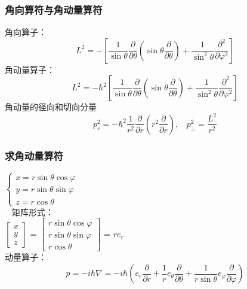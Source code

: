 \begin{frame}
	\frametitle{ 角向算符与角动量算符 }	
	角向算子：
	\begin{equation*}
		L^2 = - \left[ \frac{1}{ \sin \theta  } \frac{\partial }{\partial \theta } (\sin \theta \frac{\partial }{\partial \theta } )
		+\frac{1}{ \sin^2 \theta  } \frac{\partial^2}{\partial\varphi ^2} \right]
	\end{equation*}	
    角动量算子：
		\begin{equation*}
		L^2 = -\hbar ^2 \left[ \frac{1}{ \sin \theta  } \frac{\partial }{\partial \theta } (\sin \theta \frac{\partial }{\partial \theta } )
		+\frac{1}{ \sin^2 \theta  } \frac{\partial^2}{\partial\varphi ^2} \right]
	\end{equation*}	
	角动量的径向和切向分量
	\begin{equation*}
	p_r ^2 = -\hbar ^2  \frac{1}{r^2} \frac{\partial }{\partial r} (r^2\frac{\partial }{\partial r} )  ,~~~~	p_ \perp  ^2 =  \frac{L^2}{r^2}
	\end{equation*}	
\end{frame}		

\begin{frame}
	\frametitle{ 求角动量算符 }	
	$\begin{cases}
		x= r\sin \theta \cos \varphi \\
		y= r\sin \theta \sin \varphi \\
		z=r\cos \theta
	\end{cases} $\\  \vspace{0.3cm}
	矩阵形式： \\
	$
	\left[\begin{array}{ccc}
		x \\
		y \\
		z
	\end{array}\right]$
	=
	$\left[\begin{array}{ccc}
		r\sin \theta \cos \varphi  \\
		r\sin \theta \sin \varphi  \\
		r\cos \theta
	\end{array}\right]$	
	=
	$r e_r$ \\ \vspace{0.3cm}
	动量算子： 
	\begin{equation*}
		\hat{p}=-i\hbar	\nabla  =  -i\hbar  ( e_{r} \frac{\partial}{\partial r}+\frac{1}{r} e_{\theta} \frac{\partial}{\partial \theta}+\frac{1}{r \sin \theta} e_{\varphi} \frac{\partial}{\partial \varphi})
	\end{equation*}
\end{frame}	

